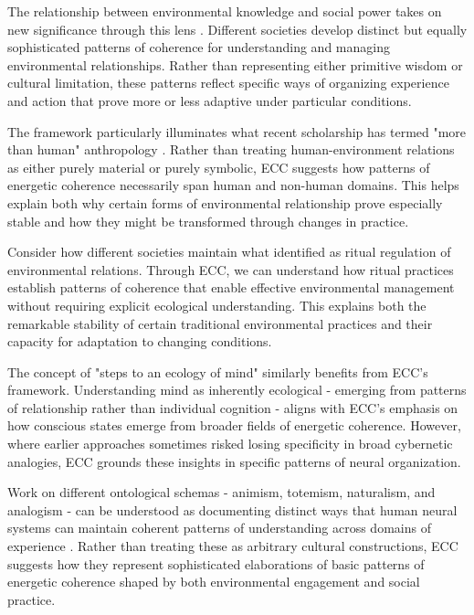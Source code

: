 The relationship between environmental knowledge and social power takes on new significance through this lens \cite{tsing2015mushroom}. Different societies develop distinct but equally sophisticated patterns of coherence for understanding and managing environmental relationships. Rather than representing either primitive wisdom or cultural limitation, these patterns reflect specific ways of organizing experience and action that prove more or less adaptive under particular conditions.

The framework particularly illuminates what recent scholarship has termed "more than human" anthropology \cite{kohn2013forests}. Rather than treating human-environment relations as either purely material or purely symbolic, ECC suggests how patterns of energetic coherence necessarily span human and non-human domains. This helps explain both why certain forms of environmental relationship prove especially stable and how they might be transformed through changes in practice.

Consider how different societies maintain what \cite{rappaport1984pigs} identified as ritual regulation of environmental relations. Through ECC, we can understand how ritual practices establish patterns of coherence that enable effective environmental management without requiring explicit ecological understanding. This explains both the remarkable stability of certain traditional environmental practices and their capacity for adaptation to changing conditions.

The concept of "steps to an ecology of mind" \cite{bateson1972steps} similarly benefits from ECC's framework. Understanding mind as inherently ecological - emerging from patterns of relationship rather than individual cognition - aligns with ECC's emphasis on how conscious states emerge from broader fields of energetic coherence. However, where earlier approaches sometimes risked losing specificity in broad cybernetic analogies, ECC grounds these insights in specific patterns of neural organization.

Work on different ontological schemas - animism, totemism, naturalism, and analogism - can be understood as documenting distinct ways that human neural systems can maintain coherent patterns of understanding across domains of experience \cite{descola2013beyond}. Rather than treating these as arbitrary cultural constructions, ECC suggests how they represent sophisticated elaborations of basic patterns of energetic coherence shaped by both environmental engagement and social practice.

